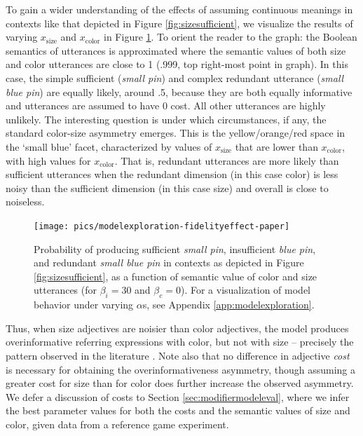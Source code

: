 \documentclass[11pt]{article}
\newcommand{\figref}[1]{Figure \ref{#1}}
\newcommand{\appref}[1]{Appendix \ref{#1}}
\newcommand{\sectionref}[1]{Section \ref{#1}}
\begin{document}
To gain a wider understanding of the effects of assuming continuous meanings in contexts like that depicted in \figref{fig:sizesufficient}, we visualize the results of varying  $x_{\text{size}}$ and $x_{\text{color}}$ in \figref{fig:basicasymmetry}. To orient the reader to the graph: the Boolean semantics of utterances is approximated where the  semantic values of both size and color utterances are close to 1 (.999, top right-most point in graph).  In this case, the simple sufficient (\emph{small pin}) and complex redundant utterance (\emph{small blue pin}) are equally likely, around .5, because they are both equally informative and utterances are assumed to have 0 cost. All other utterances are highly unlikely. The interesting question is under which circumstances, if any,  the standard color-size asymmetry emerges. This is the yellow/orange/red space in the `small blue' facet, characterized by values of $x_{\text{size}}$ that are lower than $x_{\text{color}}$, with high values for $x_{\text{color}}$. That is, redundant utterances are more likely than sufficient utterances when the redundant dimension (in this case color) is less noisy than the sufficient dimension (in this case size) and overall is close to noiseless. 

\begin{figure}
\centering
\texttt{[image: pics/modelexploration-fidelityeffect-paper]}

\caption{Probability of producing sufficient \emph{small pin}, insufficient \emph{blue pin}, and redundant \emph{small blue pin} in contexts as depicted in \figref{fig:sizesufficient}, as a function of semantic value of color and size utterances (for $\beta_i = 30$ and $ \beta_c = 0$). For a visualization of model behavior under varying $\alpha$s, see \appref{app:modelexploration}.}
\label{fig:basicasymmetry}
\end{figure}

Thus, when size adjectives are noisier than color adjectives, the model produces overinformative referring expressions with color, but not with size -- precisely the pattern observed in the literature \cite{Pechmann1989, gatt2011}. Note also that no difference in adjective \emph{cost} is necessary for obtaining the overinformativeness asymmetry, though assuming a greater cost for size than for color does further increase the observed asymmetry. We defer a discussion of costs to \sectionref{sec:modifiermodeleval}, where we infer the best parameter values for both the costs and the semantic values of size and color, given data from a reference game experiment.
\end{document}
